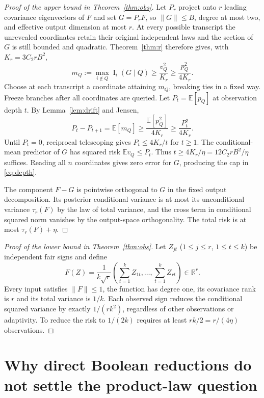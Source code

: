 \documentclass[11pt,letterpaper]{article}
\theoremstyle{definition}\newtheorem{definition}[theorem]{Definition}
\newcommand{\E}{\mathbb E}
\newcommand{\Inf}{\operatorname{I}}
\newcommand{\Ctwo}{C_2}
\newcommand{\norm}[1]{\lVert #1\rVert}
\begin{document}
\begin{proof}[Proof of the upper bound in Theorem~\ref{thm:obs}]
Let $P_r$ project onto $r$ leading covariance eigenvectors of $F$ and set $G=P_rF$, so $\norm G\le B$, degree at most two, and effective output dimension at most $r$. At every possible transcript the unrevealed coordinates retain their original independent laws and the section of $G$ is still bounded and quadratic. Theorem~\ref{thm:r} therefore gives, with $K_r=3\Ctwo rB^2$,
\[
m_Q:=\max_{i\notin Q}\Inf_i(G\mid Q)\ge\frac{v_Q^2}{K_r}\ge\frac{p_Q^2}{4K_r}.
\]
Choose at each transcript a coordinate attaining $m_Q$, breaking ties in a fixed way. Freeze branches after all coordinates are queried. Let $P_t=\E[p_Q]$ at observation depth $t$. By Lemma~\ref{lem:drift} and Jensen,
\begin{equation}\label{eq:recurrence}
P_t-P_{t+1}=\E[m_Q]\ge\frac{\E[p_Q^2]}{4K_r}\ge\frac{P_t^2}{4K_r}.
\end{equation}
Until $P_t=0$, reciprocal telescoping gives $P_t\le4K_r/t$ for $t\ge1$. The conditional-mean predictor of $G$ has squared risk $\E v_Q\le P_t$. Thus $t\ge4K_r/\eta=12\Ctwo rB^2/\eta$ suffices. Reading all $n$ coordinates gives zero error for $G$, producing the cap in \eqref{eq:depth}.

The component $F-G$ is pointwise orthogonal to $G$ in the fixed output decomposition. Its posterior conditional variance is at most its unconditional variance $\tau_r(F)$ by the law of total variance, and the cross term in conditional squared norm vanishes by the output-space orthogonality. The total risk is at most $\tau_r(F)+\eta$.
\end{proof}

\begin{proof}[Proof of the lower bound in Theorem~\ref{thm:obs}]
Let $Z_{jt}$ ($1\le j\le r$, $1\le t\le k$) be independent fair signs and define
\begin{equation}\label{eq:lower}
F(Z)=\frac1{k\sqrt r}\left(\sum_{t=1}^kZ_{1t},\ldots,\sum_{t=1}^kZ_{rt}\right)\in\mathbb R^r.
\end{equation}
Every input satisfies $\norm F\le1$, the function has degree one, its covariance rank is $r$ and its total variance is $1/k$. Each observed sign reduces the conditional squared variance by exactly $1/(rk^2)$, regardless of other observations or adaptivity. To reduce the risk to $1/(2k)$ requires at least $rk/2=r/(4\eta)$ observations.
\end{proof}

\section{Why direct Boolean reductions do not settle the product-law question}\label{sec:attack}
\end{document}
